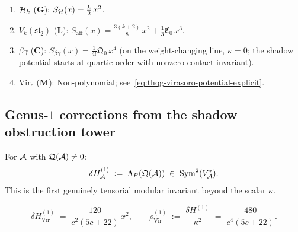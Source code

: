 \begin{example}
\begin{enumerate}[label=\textup{(\alph*)}]
\item $\mathcal{H}_k$ ($\mathbf{G}$):
 $S_{\mathcal{H}}(x) = \frac{k}{2}\,x^2$.
\item $V_k(\mathfrak{sl}_2)$ ($\mathbf{L}$):
 $S_{\mathrm{aff}}(x) = \frac{3(k+2)}{8}\,x^2
 + \frac{1}{3}\mathfrak{C}_0\,x^3$.
\item $\beta\gamma$ ($\mathbf{C}$):
 $S_{\beta\gamma}(x) = \frac{1}{4!}\mathfrak{Q}_0\,x^4$
 (on the weight-changing line, $\kappa = 0$; the shadow potential
 starts at quartic order with nonzero contact invariant).
\item $\mathrm{Vir}_c$ ($\mathbf{M}$):
 Non-polynomial; see~\eqref{eq:thqg-virasoro-potential-explicit}.
\end{enumerate}
\end{example}



\subsection{Genus-$1$ corrections from the shadow obstruction tower}

\begin{theorem}
\ClaimStatusProvedHere
{}
For $\mathcal{A}$ with $\mathfrak{Q}(\mathcal{A}) \neq 0$:
\begin{equation}%
\delta H^{(1)}_\cA
\;:=\;
\Lambda_P(\mathfrak{Q}(\cA))
\;\in\;
\operatorname{Sym}^2(V_\cA^*).
\end{equation}
This is the first genuinely tensorial modular invariant
beyond the scalar $\kappa$.
\end{theorem}

\begin{corollary}
\ClaimStatusProvedHere
{}
\begin{equation}%
\delta H^{(1)}_{\mathrm{Vir}}
\;=\;
\frac{120}{c^2(5c+22)}\,x^2,
\qquad
\rho^{(1)}_{\mathrm{Vir}}
\;:=\;
\frac{\delta H^{(1)}}{\kappa^2}
\;=\;
\frac{480}{c^4(5c+22)}.
\end{equation}
\end{corollary}

